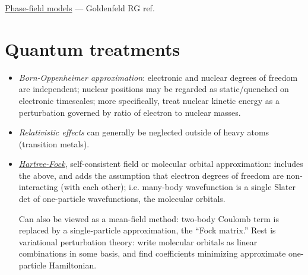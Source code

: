 \documentclass[notitlepage,openany,11pt]{report}
\theoremstyle{plain}%
\numberwithin{equation}{section}
\begin{document}
\href{https://en.wikipedia.org/wiki/Phase-field_model}{Phase-field models} --- Goldenfeld RG ref.


\section{Quantum treatments}

\begin{itemize}
\item \emph{Born-Oppenheimer approximation}: electronic and nuclear degrees of freedom are independent; nuclear positions may be regarded as static/quenched on electronic timescales; more specifically, treat nuclear kinetic energy as a perturbation governed by ratio of electron to nuclear masses.

\item \emph{Relativistic effects} can generally be neglected outside of heavy atoms (transition metals).

\item \emph{\href{https://en.wikipedia.org/wiki/Hartree\%E2\%80\%93Fock_method}{Hartree-Fock}}, self-consistent field or molecular orbital approximation: includes the above, and adds the assumption that electron degrees of freedom are non-interacting (with each other); i.e. many-body wavefunction is a single Slater det of one-particle wavefunctions, the molecular orbitals.

Can also be viewed as a mean-field method: two-body Coulomb term is replaced by a single-particle approximation, the ``Fock matrix.''  Rest is variational perturbation theory: write molecular orbitals as linear combinations in some basis, and find coefficients minimizing approximate one-particle Hamiltonian.


\end{itemize}
\end{document}
